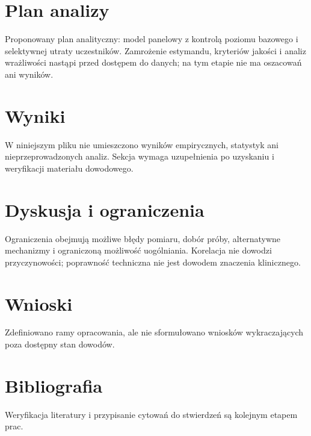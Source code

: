 \documentclass[11pt,a4paper]{article}
\begin{document}
\section{Plan analizy}

Proponowany plan analityczny: model panelowy z kontrolą poziomu bazowego i selektywnej utraty uczestników. Zamrożenie estymandu, kryteriów jakości i analiz wrażliwości nastąpi przed dostępem do danych; na tym etapie nie ma oszacowań ani wyników.

\section{Wyniki}

W niniejszym pliku nie umieszczono wyników empirycznych, statystyk ani nieprzeprowadzonych analiz. Sekcja wymaga uzupełnienia po uzyskaniu i weryfikacji materiału dowodowego.

\section{Dyskusja i ograniczenia}

Ograniczenia obejmują możliwe błędy pomiaru, dobór próby, alternatywne mechanizmy i ograniczoną możliwość uogólniania. Korelacja nie dowodzi przyczynowości; poprawność techniczna nie jest dowodem znaczenia klinicznego.

\section{Wnioski}

Zdefiniowano ramy opracowania, ale nie sformułowano wniosków wykraczających poza dostępny stan dowodów.

\section*{Bibliografia}

Weryfikacja literatury i przypisanie cytowań do stwierdzeń są kolejnym etapem prac.
\end{document}
